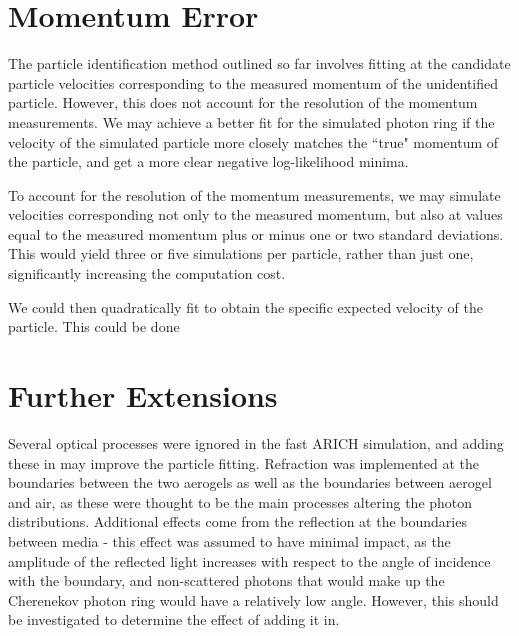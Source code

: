 

\section{Momentum Error}
The particle identification method outlined so far involves fitting at the candidate particle velocities corresponding to the measured momentum of the unidentified particle.
However, this does not account for the resolution of the momentum measurements.
We may achieve a better fit for the simulated photon ring if the velocity of the simulated particle more closely matches the ``true" momentum of the particle, and get a more clear negative log-likelihood minima. 

To account for the resolution of the momentum measurements, we may simulate velocities corresponding not only to the measured momentum, but also at values equal to the measured momentum plus or minus one or two standard deviations.
This would yield three or five simulations per particle, rather than just one, significantly increasing the computation cost. 

We could then quadratically fit to obtain the specific expected velocity of the particle.
This could be done


\section{Further Extensions}
Several optical processes were ignored in the fast ARICH simulation, and adding these in may improve the particle fitting. 
Refraction was implemented at the boundaries between the two aerogels as well as the boundaries between aerogel and air, as these were thought to be the main processes altering the photon distributions.
Additional effects come from the reflection at the boundaries between media - this effect was assumed to have minimal impact, as the amplitude of the reflected light increases with respect to the angle of incidence with the boundary, and non-scattered photons that would make up the Cherenekov photon ring would have a relatively low angle.
However, this should be investigated to determine the effect of adding it in.

